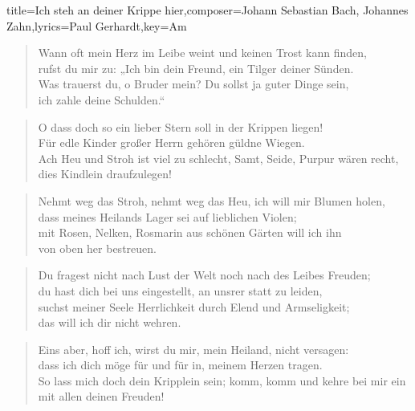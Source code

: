 \documentclass[]{leadsheet}
\begin{document}
\begin{song}{title={Ich steh an deiner Krippe hier},composer={Johann Sebastian Bach, Johannes Zahn},lyrics={Paul Gerhardt},key={Am}}
\begin{verse}
Wann oft mein Herz im Leibe weint 
und keinen Trost kann finden, \\
rufst du mir zu: „Ich bin dein Freund, 
ein Tilger deiner Sünden. \\
Was trauerst du, o Bruder mein? 
Du sollst ja guter Dinge sein, \\
ich zahle deine Schulden.“ 
\end{verse}

\begin{verse}
O dass doch so ein lieber Stern 
soll in der Krippen liegen! \\
Für edle Kinder großer Herrn 
gehören güldne Wiegen. \\
Ach Heu und Stroh ist viel zu schlecht, 
Samt, Seide, Purpur wären recht, \\
dies Kindlein draufzulegen! 
\end{verse}

\begin{verse}
Nehmt weg das Stroh, nehmt weg das Heu, 
ich will mir Blumen holen, \\
dass meines Heilands Lager sei 
auf lieblichen Violen; \\
mit Rosen, Nelken, Rosmarin 
aus schönen Gärten will ich ihn \\
von oben her bestreuen. 
\end{verse}

\begin{verse}
Du fragest nicht nach Lust der Welt 
noch nach des Leibes Freuden; \\
du hast dich bei uns eingestellt, 
an unsrer statt zu leiden, \\
suchst meiner Seele Herrlichkeit 
durch Elend und Armseligkeit; \\
das will ich dir nicht wehren. 
\end{verse}

\begin{verse}
Eins aber, hoff ich, wirst du mir, 
mein Heiland, nicht versagen: \\
dass ich dich möge für und für 
in, meinem Herzen tragen. \\
So lass mich doch dein Kripplein sein; 
komm, komm und kehre bei mir ein \\
mit allen deinen Freuden! 
\end{verse}

\end{song}
\end{document}
